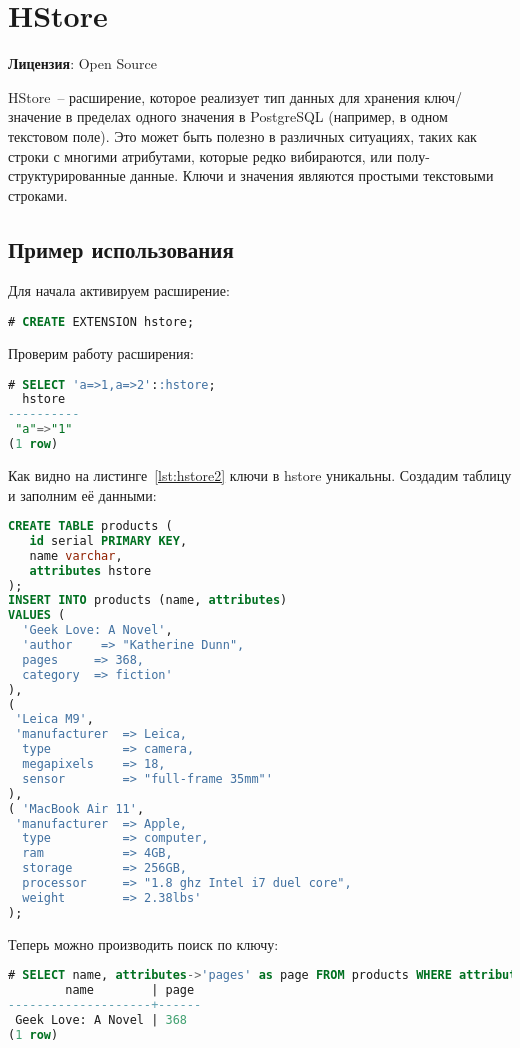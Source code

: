 \section{HStore}
\textbf{Лицензия}: Open Source

HStore~-- расширение, которое реализует тип данных для хранения ключ/значение в пределах одного значения в PostgreSQL (например, в одном текстовом поле). Это может быть полезно в различных ситуациях, таких как строки с многими атрибутами, которые редко вибираются, или полу-структурированные данные. Ключи и значения являются простыми текстовыми строками.

\subsection{Пример использования}

Для начала активируем расширение:

\begin{lstlisting}[language=SQL,label=lst:hstore1,caption=Активация hstore]
# CREATE EXTENSION hstore;
\end{lstlisting}

Проверим работу расширения:

\begin{lstlisting}[language=SQL,label=lst:hstore2,caption=Проверка hstore]
# SELECT 'a=>1,a=>2'::hstore;
  hstore
----------
 "a"=>"1"
(1 row)
\end{lstlisting}

Как видно на листинге~\ref{lst:hstore2} ключи в hstore уникальны. Создадим таблицу и заполним её данными:

\begin{lstlisting}[language=SQL,label=lst:hstore3,caption=Проверка hstore]
CREATE TABLE products (
   id serial PRIMARY KEY,
   name varchar,
   attributes hstore
);
INSERT INTO products (name, attributes)
VALUES (
  'Geek Love: A Novel',
  'author    => "Katherine Dunn",
  pages     => 368,
  category  => fiction'
),
(
 'Leica M9',
 'manufacturer  => Leica,
  type          => camera,
  megapixels    => 18,
  sensor        => "full-frame 35mm"'
),
( 'MacBook Air 11',
 'manufacturer  => Apple,
  type          => computer,
  ram           => 4GB,
  storage       => 256GB,
  processor     => "1.8 ghz Intel i7 duel core",
  weight        => 2.38lbs'
);
\end{lstlisting}

Теперь можно производить поиск по ключу:

\begin{lstlisting}[language=SQL,label=lst:hstore4,caption=Поиск по ключу]
# SELECT name, attributes->'pages' as page FROM products WHERE attributes ? 'pages';
        name        | page
--------------------+------
 Geek Love: A Novel | 368
(1 row)
\end{lstlisting}

